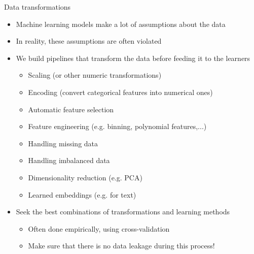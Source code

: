 \begin{frame}[allowframebreaks]{Data transformations}
    \begin{itemize}
        \item Machine learning models make a lot of assumptions about the data
        \item In reality, these assumptions are often violated
        \item We build pipelines that transform the data before feeding it to the learners
              \begin{itemize}
                  \item Scaling (or other numeric transformations)
                  \item Encoding (convert categorical features into numerical ones)
                  \item Automatic feature selection
                  \item Feature engineering (e.g. binning, polynomial features,...)
                  \item Handling missing data
                  \item Handling imbalanced data
                  \item Dimensionality reduction (e.g. PCA)
                  \item Learned embeddings (e.g. for text)
              \end{itemize}
        \item Seek the best combinations of transformations and learning methods
              \begin{itemize}
                  \item Often done empirically, using cross-validation
                  \item Make sure that there is no data leakage during this process!
              \end{itemize}
    \end{itemize}
\end{frame}